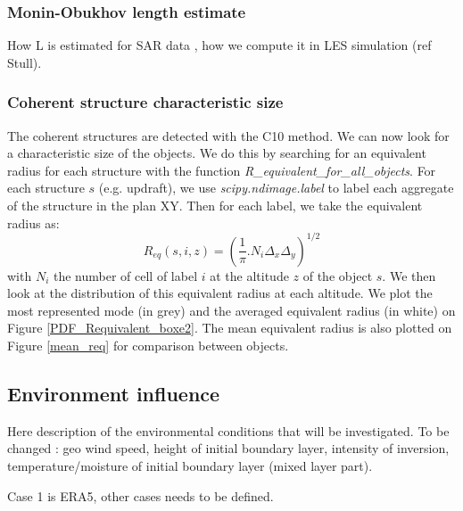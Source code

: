 \documentclass[draft]{agujournal2019} %
\begin{document}
                \subsubsection{Monin-Obukhov length estimate}
                \label{subsubsection_MO_length_estimate}

                How L is estimated for SAR data \cite{odriscoll_obukhov_2023}, how we compute it in LES simulation (ref Stull).

                \subsubsection{Coherent structure characteristic size}
                \label{subsubsection_CS_characteristic_size}

                The coherent structures are detected with the C10 method. We can now look for a characteristic size of the objects. We do this by searching for an equivalent radius for each structure with the function \textit{R\_equivalent\_for\_all\_objects}. For each structure $s$ (e.g. updraft), we use \textit{scipy.ndimage.label} to label each aggregate of the structure in the plan XY. Then for each label, we take the equivalent radius as:
                \begin{equation}
                    R_{eq}(s,i,z) = ( \frac{1}{\pi} . N_i \Delta_x\Delta_y)^{1/2}
                \end{equation}
                with $N_i$ the number of cell of label $i$ at the altitude $z$ of the object $s$. We then look at the distribution of this equivalent radius at each altitude. We plot the most represented mode (in grey) and the averaged equivalent radius (in white) on Figure \ref{PDF_Requivalent_boxe2}. The mean equivalent radius is also plotted on Figure \ref{mean_req} for comparison between objects. 
                            
            \subsection{Environment influence}
            \label{subsection_Env_sensitivity}
            Here description of the environmental conditions that will be investigated. To be changed : geo wind speed, height of initial boundary layer, intensity of inversion, temperature/moisture of initial boundary layer (mixed layer part).

            Case 1 is ERA5, other cases needs to be defined.
\end{document}
